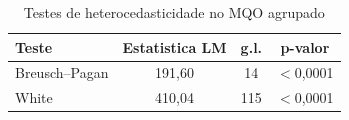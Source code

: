 \begin{table}[htbp]\centering
\caption{Testes de heterocedasticidade no MQO agrupado}\label{tab:q3_het}
\begin{tabular}{lccc}
\toprule
Teste & Estatistica LM & g.l. & p-valor \\
\midrule
Breusch--Pagan & 191,60 & 14 & $<$0,0001 \\
White & 410,04 & 115 & $<$0,0001 \\
\bottomrule
\end{tabular}
\par\vspace{2pt}{\footnotesize\itshape $H_0$: homocedasticidade. Estatistica LM $=n\cdot R^2$ da regressao auxiliar. Rejeitar $H_0$ indica heterocedasticidade.}
\end{table}

